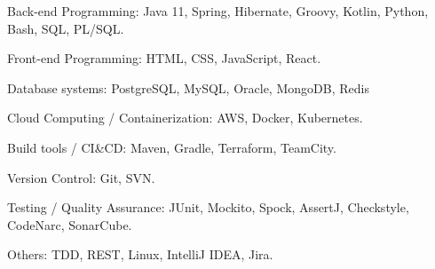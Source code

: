 

\begin{cvskills}


  \cvskill
    {Back-end Programming:} %
    {Java 11, Spring, Hibernate, Groovy, Kotlin, Python, Bash, SQL, PL/SQL.} %

  \cvskill
    {Front-end Programming:} %
    {HTML, CSS, JavaScript, React.} %

  \cvskill
    {Database systems:} %
    {PostgreSQL, MySQL, Oracle, MongoDB, Redis} %

  \cvskill
    {Cloud Computing / Containerization:} %
    {AWS, Docker, Kubernetes.} %

  \cvskill
    {Build tools / CI\&CD:} %
    {Maven, Gradle, Terraform, TeamCity.} %

  \cvskill
    {Version Control:} %
    {Git, SVN.} %

  \cvskill
    {Testing / Quality Assurance:} %
    {JUnit, Mockito, Spock, AssertJ, Checkstyle, CodeNarc, SonarCube.} %
    
  \cvskill
    {Others:} %
    {TDD, REST, Linux, IntelliJ IDEA, Jira.} %



\end{cvskills}
